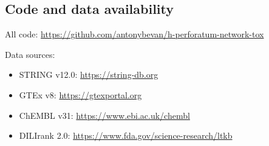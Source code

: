\subsection{Code and data availability}

All code: \url{https://github.com/antonybevan/h-perforatum-network-tox}

Data sources:
\begin{itemize}
    \item STRING v12.0: \url{https://string-db.org}
    \item GTEx v8: \url{https://gtexportal.org}
    \item ChEMBL v31: \url{https://www.ebi.ac.uk/chembl}
    \item DILIrank 2.0: \url{https://www.fda.gov/science-research/ltkb}
\end{itemize}
